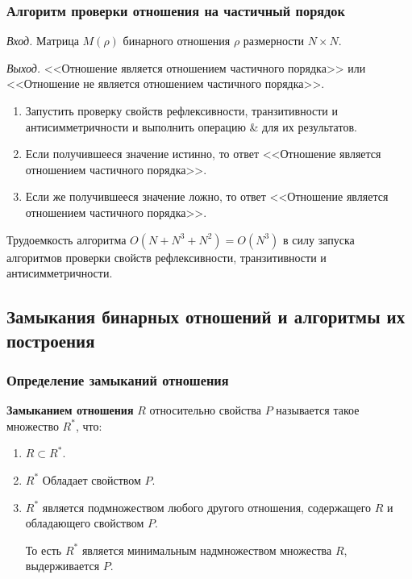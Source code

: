 \documentclass[bachelor, och, labwork]{shiza}
\begin{document}
\subsubsection{Алгоритм проверки отношения на частичный порядок}

\textit{Вход.} Матрица $M(\rho)$ бинарного отношения $\rho$ размерности
$N \times N$.

\textit{Выход.} <<Отношение является
отношением частичного порядка>> или <<Отношение не является отношением 
частичного порядка>>.

\begin{enumerate}
    
    \item Запустить проверку свойств рефлексивности, транзитивности и 
    антисимметричности и выполнить операцию \& для их результатов.
    
    \item Если получившееся значение истинно, то ответ <<Отношение является
    отношением частичного порядка>>.
    
    \item Если же получившееся значение ложно, то ответ <<Отношение является
    отношением частичного порядка>>.

\end{enumerate}
Трудоемкость алгоритма $O(N+N^3+N^2) = O(N^3)$ в силу запуска алгоритмов проверки
свойств рефлексивности, транзитивности и антисимметричности.

\subsection{Замыкания бинарных отношений и алгоритмы их построения}

\subsubsection{Определение замыканий отношения}

\textbf{Замыканием отношения} $R$ относительно свойства $P$ называется такое
множество $R^*$, что:

\begin{enumerate}

    \item $R \subset R^*$.

    \item $R^*$ Обладает свойством $P$.

    \item $R^*$ является подмножеством любого другого отношения, содержащего $R$
    и обладающего свойством $P$. 

    То есть $R^*$ является минимальным надмножеством множества $R$, 
    выдерживается $P$.

\end{enumerate}
\end{document}
